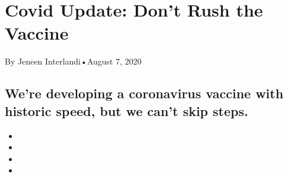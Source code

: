 \hypertarget{covid-update-dont-rush-the-vaccine-1}{%
\section{Covid Update: Don't Rush the
Vaccine}\label{covid-update-dont-rush-the-vaccine-1}}

By Jeneen Interlandi•August 7, 2020

\hypertarget{were-developing-a-coronavirus-vaccine-with-historic-speed-but-we-cant-skip-steps-1}{%
\subsection{We're developing a coronavirus vaccine with historic speed,
but we can't skip
steps.}\label{were-developing-a-coronavirus-vaccine-with-historic-speed-but-we-cant-skip-steps-1}}

\begin{itemize}
\item
\item
\item
\item
\end{itemize}

